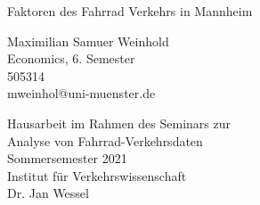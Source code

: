 \documentclass[a4paper,12pt]{thesis}
\begin{document}

\begin{center}								%
	\begin{LARGE}								%
		Faktoren des Fahrrad Verkehrs in Mannheim						%
	\end{LARGE}								%
	
	\vspace{\fill}								%
	
	\begin{large}								%
		Maximilian Samuer Weinhold\\					%
		Economics, 6. Semester\\
		505314\\
		mweinhol@uni-muenster.de\\
		
		\vspace{\fill}
		
		Hausarbeit im Rahmen des Seminars zur\\
		Analyse von Fahrrad-Verkehrsdaten\\
		Sommersemester 2021\\
		Institut für Verkehrswissenschaft\\
		Dr. Jan Wessel\\
	\end{large}
	
	\thispagestyle{empty}						%
	
\end{center}								%

\newpage									%


\onehalfspacing	
\thispagestyle{empty}	
\tableofcontents
\end{document}
